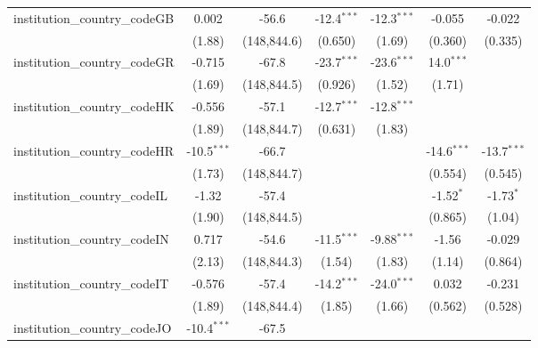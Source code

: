 \begin{tabular}{lcccccc}
   institution\_country\_codeGB          & 0.002         & -56.6         & -12.4$^{***}$ & -12.3$^{***}$ & -0.055        & -0.022\\   
                                         & (1.88)        & (148,844.6)   & (0.650)       & (1.69)        & (0.360)       & (0.335)\\   
   institution\_country\_codeGR          & -0.715        & -67.8         & -23.7$^{***}$ & -23.6$^{***}$ & 14.0$^{***}$  &   \\   
                                         & (1.69)        & (148,844.5)   & (0.926)       & (1.52)        & (1.71)        &   \\   
   institution\_country\_codeHK          & -0.556        & -57.1         & -12.7$^{***}$ & -12.8$^{***}$ &               &   \\   
                                         & (1.89)        & (148,844.7)   & (0.631)       & (1.83)        &               &   \\   
   institution\_country\_codeHR          & -10.5$^{***}$ & -66.7         &               &               & -14.6$^{***}$ & -13.7$^{***}$\\   
                                         & (1.73)        & (148,844.7)   &               &               & (0.554)       & (0.545)\\   
   institution\_country\_codeIL          & -1.32         & -57.4         &               &               & -1.52$^{*}$   & -1.73$^{*}$\\   
                                         & (1.90)        & (148,844.5)   &               &               & (0.865)       & (1.04)\\   
   institution\_country\_codeIN          & 0.717         & -54.6         & -11.5$^{***}$ & -9.88$^{***}$ & -1.56         & -0.029\\   
                                         & (2.13)        & (148,844.3)   & (1.54)        & (1.83)        & (1.14)        & (0.864)\\   
   institution\_country\_codeIT          & -0.576        & -57.4         & -14.2$^{***}$ & -24.0$^{***}$ & 0.032         & -0.231\\   
                                         & (1.89)        & (148,844.4)   & (1.85)        & (1.66)        & (0.562)       & (0.528)\\   
   institution\_country\_codeJO          & -10.4$^{***}$ & -67.5         &               &               &               &   \\   

\end{tabular}
